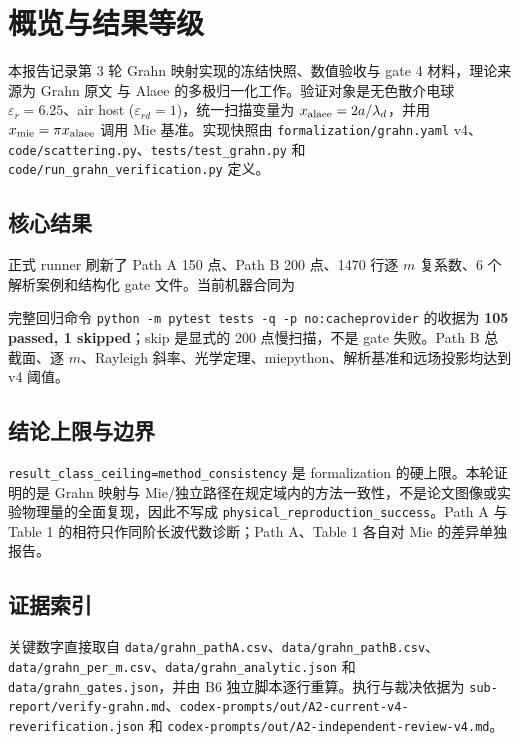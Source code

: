 \section{概览与结果等级}

本报告记录第 3 轮 Grahn 映射实现的冻结快照、数值验收与 gate 4 材料，理论来源为 Grahn 原文\cite{Grahn2012} 与 Alaee 的多极归一化工作\cite{Alaee2018}。验证对象是无色散介电球 $\varepsilon_r=6.25$、air host ($\varepsilon_{rd}=1$)，统一扫描变量为 $x_{\rm alaee}=2a/\lambda_d$，并用 $x_{\rm mie}=\pi x_{\rm alaee}$ 调用 Mie 基准。实现快照由 \texttt{formalization/grahn.yaml} v4、\texttt{code/scattering.py}、\texttt{tests/test\_grahn.py} 和 \texttt{code/run\_grahn\_verification.py} 定义。

\subsection{核心结果}

正式 runner 刷新了 Path A 150 点、Path B 200 点、1470 行逐 $m$ 复系数、6 个解析案例和结构化 gate 文件。当前机器合同为
\begin{center}
\end{center}
完整回归命令 \texttt{python -m pytest tests -q -p no:cacheprovider} 的收据为 \textbf{105 passed, 1 skipped}；skip 是显式的 200 点慢扫描，不是 gate 失败。Path B 总截面、逐 $m$、Rayleigh 斜率、光学定理、miepython、解析基准和远场投影均达到 v4 阈值。

\subsection{结论上限与边界}

\texttt{result\_class\_ceiling=method\_consistency} 是 formalization 的硬上限。本轮证明的是 Grahn 映射与 Mie/独立路径在规定域内的方法一致性，不是论文图像或实验物理量的全面复现，因此不写成 \texttt{physical\_reproduction\_success}。Path A 与 Table 1 的相符只作同阶长波代数诊断；Path A、Table 1 各自对 Mie 的差异单独报告。

\subsection{证据索引}

关键数字直接取自 \texttt{data/grahn\_pathA.csv}、\texttt{data/grahn\_pathB.csv}、\texttt{data/grahn\_per\_m.csv}、\texttt{data/grahn\_analytic.json} 和 \texttt{data/grahn\_gates.json}，并由 B6 独立脚本逐行重算。执行与裁决依据为 \texttt{sub-report/verify-grahn.md}、\texttt{codex-prompts/out/A2-current-v4-reverification.json} 和 \texttt{codex-prompts/out/A2-independent-review-v4.md}。
